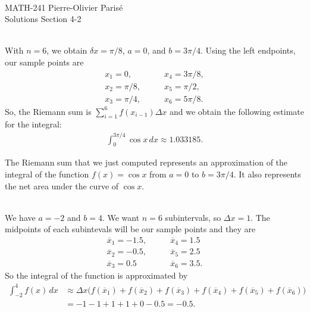 


	\noindent \hrulefill \\
	MATH-241 \hfill Pierre-Olivier Paris{\'e}\\
	Solutions Section 4-2 \hfill \semester \\\vspace*{-1cm}
	
	\noindent\hrulefill
	
	\spc	
	
	\\
	With $n = 6$, we obtain $\delta x = \pi/8$, $a = 0$, and $b = 3\pi/4$. Using the left endpoints, our sample points are
		\begin{align*}
		x_1 = 0, & \qquad x_4 = 3\pi/8, \\
		x_2 = \pi/8, & \qquad x_5 = \pi/2,\\
		x_3 = \pi/4, & \qquad x_6 = 5\pi/8 .
		\end{align*}
	So, the Riemann sum is $\sum_{i = 1}^6 f(x_{i-1}) \Delta x$ and we obtain the following estimate for the integral:
		\begin{align*}
		\int_0^{3\pi/4} \cos x \, dx \approx 1.033185 .
		\end{align*}
	
	The Riemann sum that we just computed represents an approximation of the integral of the function $f (x) = \cos x$ from $a = 0$ to $b = 3\pi/4$. It also represents the net area under the curve of $\cos x$.
	
	\spc
	
	\\
	We have $a = -2$ and $b = 4$. We want $n = 6$ subintervals, so $\Delta x = 1$. The midpoints of each subintevals will be our sample points and they are
		\begin{align*}
		\overline{x}_1 = -1.5, & \qquad \overline{x}_4 = 1.5 \\
		\overline{x}_2 = -0.5, & \qquad \overline{x}_5 = 2.5 \\
		\overline{x}_3 = 0.5 & \qquad \overline{x}_6 = 3.5 .
		\end{align*}
	So the integral of the function is approximated by
		\begin{align*}
		\int_{-2}^4 f(x) \, dx &\approx \Delta x \Big( f(\overline{x}_1) + f(\overline{x}_2) + f(\overline{x}_3) + f(\overline{x}_4) + f(\overline{x}_5) + f(\overline{x}_6) \Big) \\
		&= -1 - 1 + 1 + 1 + 0 - 0.5 = -0.5 .
		\end{align*}
		
